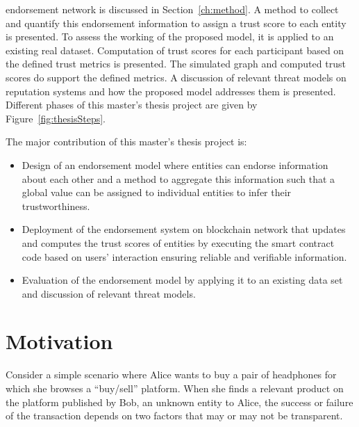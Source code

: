 endorsement network is discussed in Section~\ref{ch:method}. A method to
collect and quantify this endorsement information to assign a trust score to
each entity is presented. To assess the working of the proposed model, it is
applied to an existing real dataset. Computation of trust scores for each
participant based on the defined trust metrics is presented. The simulated
graph and computed trust scores do support the defined metrics. A discussion of
relevant threat models on reputation systems and how the proposed model
addresses them is presented. Different phases of this master's thesis project
are given by Figure~\ref{fig:thesisSteps}.\par
The major contribution of this master's thesis project is:
\begin{itemize}
	\item Design of an endorsement model where entities can endorse information
		about each other and a method to aggregate this information such that a
		global value can be assigned to individual entities to infer their
		trustworthiness.
	\item Deployment of the endorsement system on blockchain network that
		updates and computes the trust scores of entities by executing the
		smart contract code based on users' interaction ensuring reliable and
		verifiable information. 
	\item Evaluation of the endorsement model by applying it to an existing
		data set and discussion of relevant threat models.
\end{itemize}


 
\section{Motivation}
Consider a simple scenario where Alice wants to buy a pair of headphones for
which she browses a ``buy/sell'' platform. When she finds a relevant product on
the platform published by Bob, an unknown entity to Alice, the success or
failure of the transaction depends on two factors that may or may not be
transparent.
